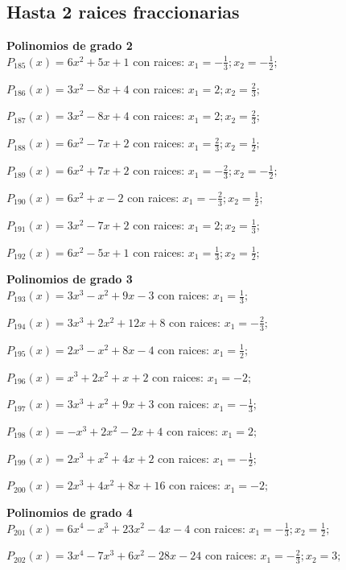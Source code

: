 \subsection{Hasta 2 raices fraccionarias}
\textbf{Polinomios de grado 2\\} 
\subitem $P_{185}(x) = 6x^2 + 5x + 1$ con raices: $x_1 = -\frac{1}{3} ; x_2 = -\frac{1}{2} ;  $

\subitem $P_{186}(x) = 3x^2 - 8x + 4$ con raices: $x_1 = 2 ; x_2 = \frac{2}{3} ;  $

\subitem $P_{187}(x) = 3x^2 - 8x + 4$ con raices: $x_1 = 2 ; x_2 = \frac{2}{3} ;  $

\subitem $P_{188}(x) = 6x^2 - 7x + 2$ con raices: $x_1 = \frac{2}{3} ; x_2 = \frac{1}{2} ;  $

\subitem $P_{189}(x) = 6x^2 + 7x + 2$ con raices: $x_1 = -\frac{2}{3} ; x_2 = -\frac{1}{2} ;  $

\subitem $P_{190}(x) = 6x^2 + x - 2$ con raices: $x_1 = -\frac{2}{3} ; x_2 = \frac{1}{2} ;  $

\subitem $P_{191}(x) = 3x^2 - 7x + 2$ con raices: $x_1 = 2 ; x_2 = \frac{1}{3} ;  $

\subitem $P_{192}(x) = 6x^2 - 5x + 1$ con raices: $x_1 = \frac{1}{3} ; x_2 = \frac{1}{2} ;  $

\textbf{Polinomios de grado 3\\} 
\subitem $P_{193}(x) = 3x^3 - x^2 + 9x - 3$ con raices: $x_1 = \frac{1}{3} ;  $

\subitem $P_{194}(x) = 3x^3 + 2x^2 + 12x + 8$ con raices: $x_1 = -\frac{2}{3} ;  $

\subitem $P_{195}(x) = 2x^3 - x^2 + 8x - 4$ con raices: $x_1 = \frac{1}{2} ;  $

\subitem $P_{196}(x) = x^3 + 2x^2 + x + 2$ con raices: $x_1 = -2 ;  $

\subitem $P_{197}(x) = 3x^3 + x^2 + 9x + 3$ con raices: $x_1 = -\frac{1}{3} ;  $

\subitem $P_{198}(x) = -x^3 + 2x^2 - 2x + 4$ con raices: $x_1 = 2 ;  $

\subitem $P_{199}(x) = 2x^3 + x^2 + 4x + 2$ con raices: $x_1 = -\frac{1}{2} ;  $

\subitem $P_{200}(x) = 2x^3 + 4x^2 + 8x + 16$ con raices: $x_1 = -2 ;  $

\textbf{Polinomios de grado 4\\} 
\subitem $P_{201}(x) = 6x^4 - x^3 + 23x^2 - 4x - 4$ con raices: $x_1 = -\frac{1}{3} ; x_2 = \frac{1}{2} ;  $

\subitem $P_{202}(x) = 3x^4 - 7x^3 + 6x^2 - 28x - 24$ con raices: $x_1 = -\frac{2}{3} ; x_2 = 3 ;  $

